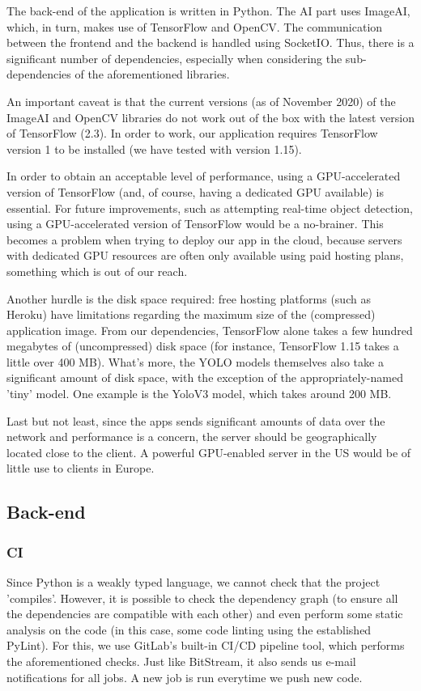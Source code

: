\documentclass[runningheads,a4paper,11pt]{report}
\begin{document}
The back-end of the application is written in Python. The AI part uses ImageAI, which, in turn, makes use of TensorFlow and OpenCV. The communication between the frontend and the backend is handled using SocketIO. Thus, there is a significant number of dependencies, especially when considering the sub-dependencies of the aforementioned libraries.

An important caveat is that the current versions (as of November 2020) of the ImageAI and OpenCV libraries do not work out of the box with the latest version of TensorFlow (2.3). In order to work, our application requires TensorFlow version 1 to be installed (we have tested with version 1.15).

In order to obtain an acceptable level of performance, using a GPU-accelerated version of TensorFlow (and, of course, having a dedicated GPU available) is essential. For future improvements, such as attempting real-time object detection, using a GPU-accelerated version of TensorFlow would be a no-brainer. This becomes a problem when trying to deploy our app in the cloud, because servers with dedicated GPU resources are often only available using paid hosting plans, something which is out of our reach.

Another hurdle is the disk space required: free hosting platforms (such as Heroku) have limitations regarding the maximum size of the (compressed) application image. From our dependencies, TensorFlow alone takes a few hundred megabytes of (uncompressed) disk space (for instance, TensorFlow 1.15 takes a little over 400 MB). What's more, the YOLO models themselves also take a significant amount of disk space, with the exception of the appropriately-named 'tiny' model. One example is the YoloV3 model, which takes around 200 MB.

Last but not least, since the apps sends significant amounts of data over the network and performance is a concern, the server should be geographically located close to the client. A powerful GPU-enabled server in the US would be of little use to clients in Europe.

\subsection{Back-end}

\subsubsection{CI}

Since Python is a weakly typed language, we cannot check that the project 'compiles'. However, it is possible to check the dependency graph (to ensure all the dependencies are compatible with each other) and even perform some static analysis on the code (in this case, some code linting using the established PyLint). For this, we use GitLab's built-in CI/CD pipeline tool, which performs the aforementioned checks. Just like BitStream, it also sends us e-mail notifications for all jobs. A new job is run everytime we push new code.
\end{document}
